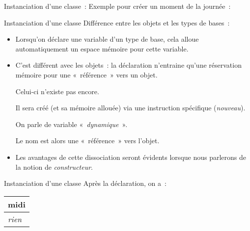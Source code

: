 \begin{frame}{Instanciation d'une classe~: Exemple}
	pour créer un moment de la journée~:
		
\end{frame}

\begin{frame}{Instanciation d'une classe}
	Différence entre les objets et les types de bases~: 
	\begin{itemize}
		\item
		Lorsqu'on déclare une	variable d'un type de base, cela alloue
		automatiquement un espace mémoire pour cette variable.
		\item
		C'est différent avec les objets~: la déclaration
		n'entraine qu'une réservation mémoire
		pour une «~référence~» vers un objet. 
		
		Celui-ci n'existe pas encore. 
		
		Il sera créé (et sa mémoire
		allouée) via une instruction spécifique (\textit{nouveau}). 
		
		On parle de variable «\textit{~dynamique~}». 
		
		Le nom est alors une «~référence~» vers l’objet. 
		\item
		Les avantages de cette dissociation seront
		évidents lorsque nous parlerons de la notion de \textit{constructeur}.
	\end{itemize}
\end{frame}

\begin{frame}{Instanciation d'une classe}
			Après la déclaration, on a~:
		\begin{center}
		\begin{tabular}{m{2.2089999cm}}
		\centering\arraybslash  midi\\\hline
		\multicolumn{1}{|m{2.2089999cm}|}{\centering\arraybslash
		\itshape rien}\\\hline
		\end{tabular}
		\end{center}
\end{frame}

